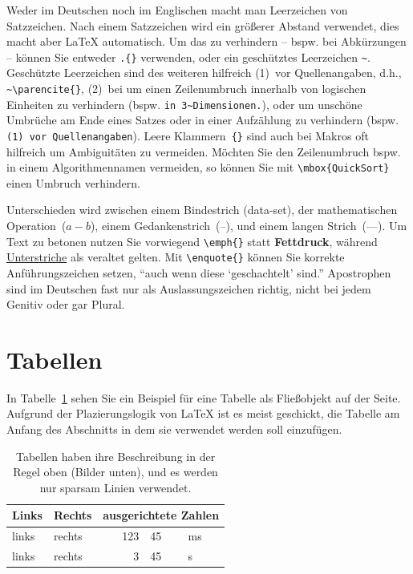Weder im Deutschen noch im Englischen macht man Leerzeichen von Satzzeichen.
Nach einem Satzzeichen wird ein größerer Abstand verwendet, dies macht aber \LaTeX{}
automatisch. Um das zu verhindern -- bspw.{} bei Abkürzungen -- können Sie entweder
\texttt{.\{\}} verwenden, oder ein geschütztes Leerzeichen \texttt{\textasciitilde}.
Geschützte Leerzeichen sind des weiteren hilfreich (1)~vor Quellenangaben, d.h., \texttt{\textasciitilde\textbackslash{}parencite\{\}},
(2)~bei um einen Zeilenumbruch innerhalb von logischen Einheiten zu verhindern
(bspw.{} \texttt{in 3\textasciitilde{}Dimensionen.}), oder um unschöne Umbrüche am Ende eines Satzes
oder in einer Aufzählung zu verhindern (bspw.{} \texttt{(1)~vor Quellenangaben}).
Leere Klammern~\texttt{\{\}} sind auch bei Makros oft hilfreich um Ambiguitäten zu vermeiden.
Möchten Sie den Zeilenumbruch bspw.{} in einem Algorithmennamen vermeiden, so
können Sie mit \texttt{\textbackslash{}mbox\{QuickSort\}} einen Umbruch verhindern.

Unterschieden wird zwischen einem Bindestrich (data-set), der mathematischen Operation~\mbox{($a-b$)},
einem Gedankenstrich~\mbox{(--)}, und einem langen Strich~\mbox{(---)}.
Um Text zu betonen nutzen Sie vorwiegend \texttt{\textbackslash{}emph\{\}} statt \textbf{Fettdruck},
während \underline{Unterstriche} als veraltet gelten.
Mit \texttt{\textbackslash{}enquote\{\}} können Sie korrekte Anführungszeichen setzen,
\enquote{auch wenn diese \enquote{geschachtelt} sind.}
Apostrophen sind im Deutschen fast nur als Auslassungszeichen richtig, nicht bei jedem Genitiv oder gar Plural.

\section{Tabellen}

In Tabelle~\ref{tab:Beispiele} sehen Sie ein Beispiel für eine Tabelle als Fließobjekt auf der Seite.
Aufgrund der Plazierungslogik von \LaTeX{} ist es meist geschickt, die Tabelle am Anfang des
Abschnitts in dem sie verwendet werden soll einzufügen.

\begin{table}[h!]
\caption{Tabellen haben ihre Beschreibung in der Regel oben (Bilder unten), und es werden nur
sparsam Linien verwendet.}
\label{tab:Beispiele}
\begin{tabular*}{\linewidth}{@{}llr@{.}l@{~}l@{}}
\toprule
Links & Rechts & \multicolumn{3}{c}{ausgerichtete Zahlen} \\
\midrule
links & rechts & 123 & 45 & ms \\
links & rechts &   3 & 45 & s \\
\bottomrule
\end{tabular*}
\end{table}

